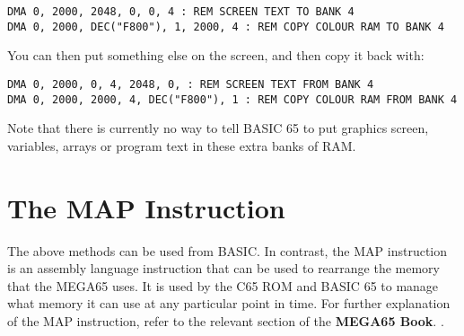 \begin{tcolorbox}[colback=black,coltext=white]
\verbatimfont{\codefont}
\begin{verbatim}
DMA 0, 2000, 2048, 0, 0, 4 : REM SCREEN TEXT TO BANK 4
DMA 0, 2000, DEC("F800"), 1, 2000, 4 : REM COPY COLOUR RAM TO BANK 4
\end{verbatim}
\end{tcolorbox}

You can then put something else on the screen, and then copy it back with:

\begin{tcolorbox}[colback=black,coltext=white]
\verbatimfont{\codefont}
\begin{verbatim}
DMA 0, 2000, 0, 4, 2048, 0, : REM SCREEN TEXT FROM BANK 4
DMA 0, 2000, 2000, 4, DEC("F800"), 1 : REM COPY COLOUR RAM FROM BANK 4
\end{verbatim}
\end{tcolorbox}

Note that there is currently no way to tell BASIC 65 to put graphics screen, variables,
arrays or program text in these extra banks of RAM.

\section{The MAP Instruction}

The above methods can be used from BASIC. In contrast, the MAP instruction is an assembly
language instruction that can be used to rearrange the memory that the MEGA65 uses.
It is used by the C65 ROM and BASIC 65 to manage what memory it can use at any particular
point in time.  For further explanation of the MAP instruction,
refer to the relevant section of
\ifdefined\printmanual
 the {\bf MEGA65 Book}.
\else
 .
\fi



